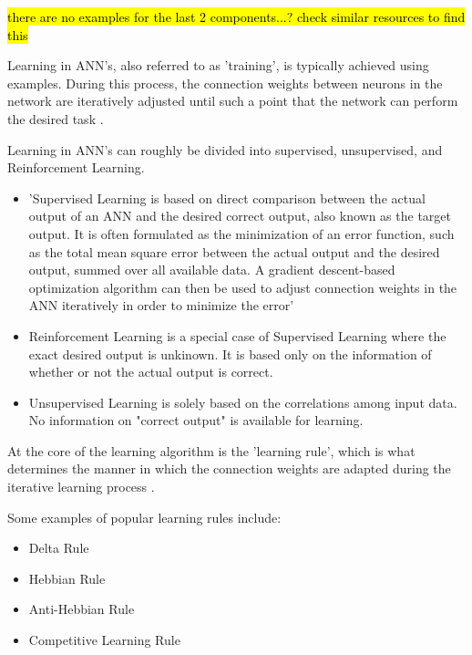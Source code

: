 \hl{there are no examples for the last 2 components...? check similar resources to find this}


Learning in ANN's, also referred to as 'training', is typically achieved using examples. During this process, the connection weights between neurons in the network are iteratively adjusted until such a point that the network can perform the desired task \cite{XinYao1999}.

Learning in ANN's can roughly be divided into supervised, unsupervised, and Reinforcement Learning.
\begin{itemize}
	\item 'Supervised Learning is based on direct comparison between the actual output of an ANN and the desired correct output, also known as the target output. It is often formulated as the minimization of an error function, such as the total mean square error between the actual output and the desired output, summed over all available data. A gradient descent-based optimization algorithm can then be used to adjust connection weights in the ANN iteratively in order to minimize the error'
	\item Reinforcement Learning is a special case of Supervised Learning where the exact desired output is unkinown. It is based only on the information of whether or not the actual output is correct.
	\item Unsupervised Learning is solely based on the correlations among input data. No information on "correct output" is available for learning.
\end{itemize}

At the core of the learning algorithm is the 'learning rule', which is what determines the manner in which the connection weights are adapted during the iterative learning process \cite{XinYao1999}.

Some examples of popular learning rules include:
\begin{itemize}
	\item Delta Rule
	\item Hebbian Rule
	\item Anti-Hebbian Rule
	\item Competitive Learning Rule
\end{itemize}


